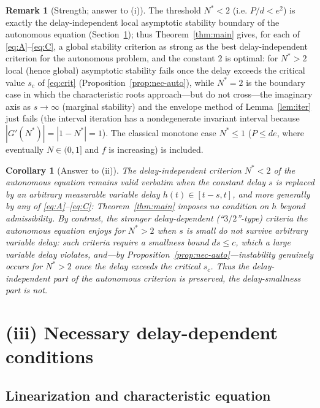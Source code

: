 \documentclass[12pt]{article}
\newtheorem{corollary}{Corollary}
\theoremstyle{definition}
\newtheorem{remark}{Remark}
\begin{document}
\begin{remark}[Strength; answer to (i)]
The threshold $N^*<2$ (i.e. $P/d<e^2$) is exactly the delay-independent local
asymptotic stability boundary of the autonomous equation
(Section~\ref{sec:nec}); thus Theorem~\ref{thm:main} gives, for each of
\eqref{eq:A}--\eqref{eq:C}, a global stability criterion as strong as the best
delay-independent criterion for the autonomous problem, and the constant $2$ is
optimal: for $N^*>2$ local (hence global) asymptotic stability fails once the
delay exceeds the critical value $s_c$ of \eqref{eq:crit}
(Proposition~\ref{prop:nec-auto}), while $N^*=2$ is the boundary case in which
the characteristic roots approach---but do not cross---the imaginary axis as
$s\to\infty$ (marginal stability) and the envelope method of
Lemma~\ref{lem:iter} just fails (the interval iteration has a nondegenerate
invariant interval because $|G'(N^*)|=|1-N^*|=1$). The classical
monotone case $N^*\le1$ ($P\le de$, where eventually $N\in(0,1]$ and $f$ is
increasing) is included.
\end{remark}

\begin{corollary}[Answer to (ii)]\label{cor:ii}
The delay-independent criterion $N^*<2$ of the autonomous equation remains valid
\emph{verbatim} when the constant delay $s$ is replaced by an arbitrary
measurable variable delay $h(t)\in[t-s,t]$, and more generally by any of
\eqref{eq:A}--\eqref{eq:C}: Theorem~\ref{thm:main} imposes no condition on $h$
beyond admissibility. By contrast, the stronger delay-dependent (``$3/2$''-type)
criteria the autonomous equation enjoys for $N^*>2$ when $s$ is small do
\emph{not} survive arbitrary variable delay: such criteria require a smallness
bound $ds\le c$, which a large variable delay violates, and—by
Proposition~\ref{prop:nec-auto}—instability genuinely occurs for $N^*>2$ once
the delay exceeds the critical $s_c$. Thus the delay-independent part of the
autonomous criterion is preserved, the delay-smallness part is not.
\end{corollary}

\section{(iii) Necessary delay-dependent conditions}\label{sec:nec}

\subsection{Linearization and characteristic equation}
\end{document}
